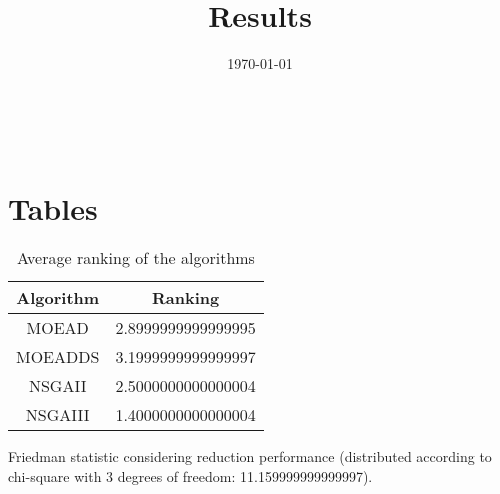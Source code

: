 \documentclass{article}
\title{Results}
\author{}
\date{\today}
\begin{document}
\oddsidemargin 0in \topmargin 0in\maketitle
\
\section{Tables}
\begin{table}[!htp]
\centering
\caption{Average ranking of the algorithms}
\begin{tabular}{c|c}
Algorithm&Ranking\\
\hline
MOEAD&2.8999999999999995\\
MOEADDS&3.1999999999999997\\
NSGAII&2.5000000000000004\\
NSGAIII&1.4000000000000004\\
\end{tabular}
\end{table}


Friedman statistic considering reduction performance (distributed according to chi-square with 3 degrees of freedom: 11.159999999999997).
\end{document}
